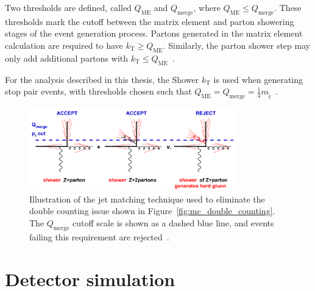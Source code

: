 Two thresholds are defined, called $Q_\mathrm{ME}$ and $Q_\mathrm{merge}$,
where $Q_\mathrm{ME} \leq Q_\mathrm{merge}$.
These thresholds mark the cutoff between the matrix element and parton
showering stages of the event generation process.
Partons generated in the matrix element calculation are required to have
$k_\mathrm{T} \geq Q_\mathrm{ME}$.
Similarly, the parton shower step may only add additional partons with
$k_\mathrm{T} \leq Q_\mathrm{ME}$~\cite{Salam:2010zt}.

For the analysis described in this thesis, the Shower $k_\mathrm{T}$ is used
when generating stop pair events, with thresholds chosen such that
$Q_\mathrm{ME} = Q_\mathrm{merge} = \frac{1}{4}m_{\tilde{t}}$~\cite{Alwall:2008qv}.

\begin{figure}
  \centering
  \includegraphics[width=0.8\textwidth]{figs/mc_gen/jet_matching.png}
  \caption[
    Illustration of the jet matching technique used to eliminate the double
    counting issue shown in
    Figure~\ref{fig:mc_double_counting}~\cite{Salam:2010zt}.
  ]{
    Illustration of the jet matching technique used to eliminate the double
    counting issue shown in
    Figure~\ref{fig:mc_double_counting}.
    The $Q_\mathrm{merge}$ cutoff scale is shown as a dashed blue line, and
    events failing this requirement are rejected~\cite{Salam:2010zt}.
  }
  \label{fig:mc_jet_matching}
\end{figure}


% 

\FloatBarrier
\section{Detector simulation}
\label{sec:det_sim}

